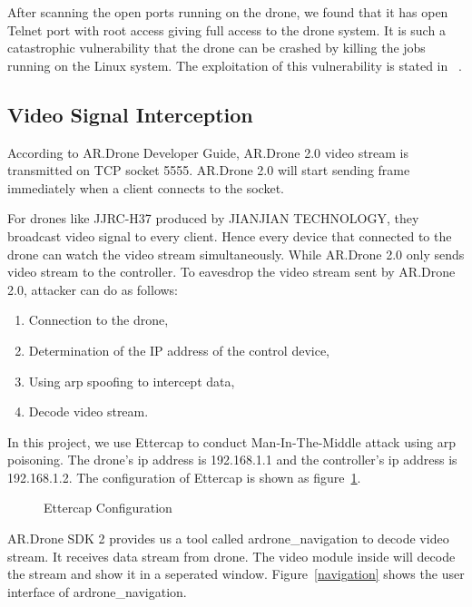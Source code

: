 \documentclass{acm_proc_article-sp}
\newcommand{\upcite}[1]{\textsuperscript{\textsuperscript{\cite{#1}}}}
\begin{document}
After scanning the open ports running on the drone, we found that it has open Telnet port with root access giving full access to the drone system. It is such a catastrophic vulnerability that the drone can be crashed by killing the jobs running on the Linux system. The exploitation of this vulnerability is stated in ~\cite{ana:attack}.

\subsection{Video Signal Interception}

According to AR.Drone Developer Guide\upcite{dev:guide}, AR.Drone 2.0 video stream is transmitted on TCP socket 5555. AR.Drone 2.0 will start sending frame immediately when a client connects to the socket. 

For drones like JJRC-H37 produced by JIANJIAN TECHNOLOGY, they broadcast video signal to every client. Hence every device that connected to the drone can watch the video stream simultaneously. While AR.Drone 2.0 only sends video stream to the controller. To eavesdrop the video stream sent by AR.Drone 2.0, attacker can do as follows:

\begin{enumerate}
  \item Connection to the drone,
  \item Determination of the IP address of the control device,
  \item Using arp spoofing to intercept data,
  \item Decode video stream.
\end{enumerate}

In this project, we use Ettercap\upcite{ettercap} to conduct Man-In-The-Middle attack using arp poisoning. The drone's ip address is 192.168.1.1 and the controller's ip address is 192.168.1.2. The configuration of Ettercap is shown as figure~\ref{ettercap}.

\begin{figure}
\centering
{}
\caption{Ettercap Configuration}
\label{ettercap}
\end{figure}


AR.Drone SDK 2 \upcite{sdk} provides us a tool called ardrone\_navigation to decode video stream. It receives data stream from drone. The video module inside will decode the stream and show it in a seperated window. Figure~\ref{navigation} shows the user interface of ardrone\_navigation.
\end{document}
